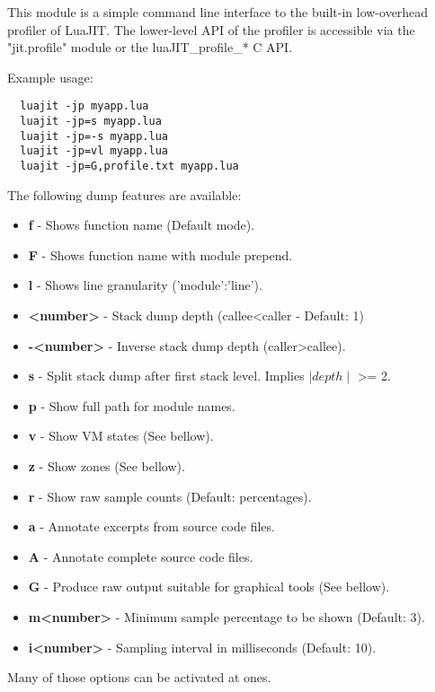 
This module is a simple command line interface to the built-in
low-overhead profiler of LuaJIT. The lower-level API of the profiler
is accessible via the "jit.profile" module or the luaJIT\_profile\_* C API.

Example usage:
\begin{lstlisting}
  luajit -jp myapp.lua
  luajit -jp=s myapp.lua
  luajit -jp=-s myapp.lua
  luajit -jp=vl myapp.lua
  luajit -jp=G,profile.txt myapp.lua
\end{lstlisting}
The following dump features are available:
 \begin{itemize}%
  \item \textbf{f} - Shows function name (Default mode).
  \item \textbf{F} - Shows function name with module prepend.
  \item \textbf{l} - Shows line granularity ('module':'line').
  \item \textbf{\textless number\textgreater} - Stack dump depth (callee\textless caller - Default: 1)
  \item \textbf{-\textless number\textgreater} - Inverse stack dump depth (caller\textgreater callee).
  \item \textbf{s} - Split stack dump after first stack level. Implies $\mid depth\mid$
  \textgreater= 2.
  \item \textbf{p} - Show full path for module names.
  \item \textbf{v} - Show VM states (See bellow).
  \item \textbf{z} - Show zones (See bellow).
  \item \textbf{r} - Show raw sample counts (Default: percentages).
  \item \textbf{a} - Annotate excerpts from source code files.
  \item \textbf{A} - Annotate complete source code files.
  \item \textbf{G} - Produce raw output suitable for graphical tools (See bellow).
  \item \textbf{m\textless number\textgreater} - Minimum sample percentage to be shown (Default: 3).
  \item \textbf{i\textless number\textgreater} - Sampling interval in milliseconds (Default: 10).
 \end{itemize}

 Many of those options can be activated at ones.\\

